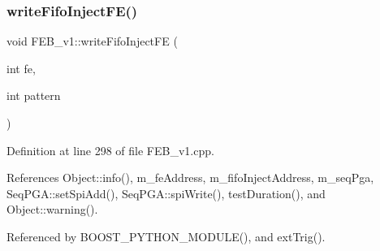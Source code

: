 \subsubsection{\texorpdfstring{write\+Fifo\+Inject\+F\+E()}{writeFifoInjectFE()}}
{\footnotesize\ttfamily void F\+E\+B\+\_\+v1\+::write\+Fifo\+Inject\+FE (\begin{DoxyParamCaption}\item[{int}]{fe,  }\item[{int}]{pattern }\end{DoxyParamCaption})}



Definition at line 298 of file F\+E\+B\+\_\+v1.\+cpp.



References Object\+::info(), m\+\_\+fe\+Address, m\+\_\+fifo\+Inject\+Address, m\+\_\+seq\+Pga, Seq\+P\+G\+A\+::set\+Spi\+Add(), Seq\+P\+G\+A\+::spi\+Write(), test\+Duration(), and Object\+::warning().



Referenced by B\+O\+O\+S\+T\+\_\+\+P\+Y\+T\+H\+O\+N\+\_\+\+M\+O\+D\+U\+L\+E(), and ext\+Trig().



